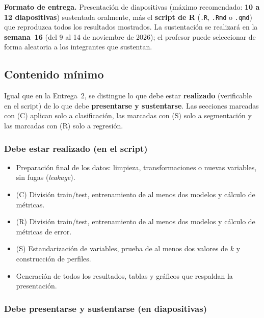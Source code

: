 \documentclass[11pt,letterpaper]{article}
\begin{document}
\textbf{Formato de entrega.} Presentación de diapositivas (máximo recomendado: \textbf{10 a 12 diapositivas}) sustentada oralmente, más el \textbf{script de R} (\texttt{.R}, \texttt{.Rmd} o \texttt{.qmd}) que reproduzca todos los resultados mostrados. La sustentación se realizará en la \textbf{semana~16} (del 9 al 14 de noviembre de 2026); el profesor puede seleccionar de forma aleatoria a los integrantes que sustentan.

\subsection{Contenido mínimo}

Igual que en la Entrega~2, se distingue lo que debe estar \textbf{realizado} (verificable en el script) de lo que debe \textbf{presentarse y sustentarse}. Las secciones marcadas con (C) aplican solo a clasificación, las marcadas con (S) solo a segmentación y las marcadas con (R) solo a regresión.

\subsubsection*{Debe estar realizado (en el script)}

\begin{itemize}
  \item Preparación final de los datos: limpieza, transformaciones o nuevas variables, sin fugas (\textit{leakage}).
  \item (C) División train/test, entrenamiento de al menos dos modelos y cálculo de métricas.
  \item (R) División train/test, entrenamiento de al menos dos modelos y cálculo de métricas de error.
  \item (S) Estandarización de variables, prueba de al menos dos valores de $k$ y construcción de perfiles.
  \item Generación de todos los resultados, tablas y gráficos que respaldan la presentación.
\end{itemize}

\subsubsection*{Debe presentarse y sustentarse (en diapositivas)}
\end{document}
